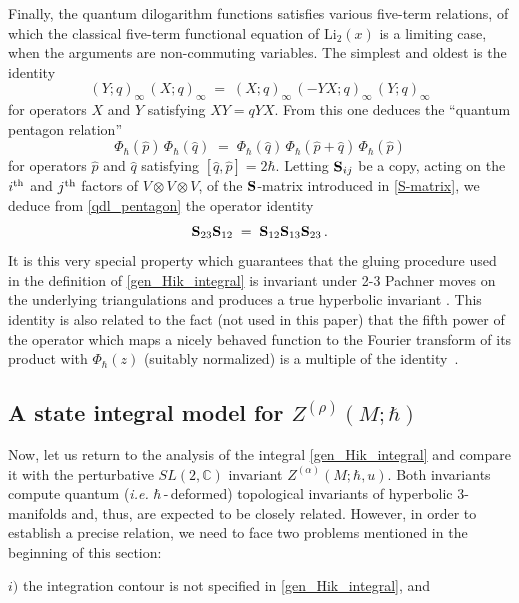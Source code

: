 \documentclass[hyper]{JHEP3}
\newcommand{\C}{{\mathbb{C}}}
\newcommand\be{\begin{equation}}
\newcommand\ee{\end{equation}}
\def\={\;=\;}
\def\Li{\text{Li}_2}
\begin{document}
\smallskip{}  Finally, the quantum dilogarithm functions
satisfies various five-term relations, of which the classical five-term functional
equation of $\Li(x)$ is a limiting case, when the arguments are non-commuting variables.
The simplest and oldest is the identity
\be (Y;q)_\infty\,(X;q)_\infty\=(X;q)_\infty\,(-YX;q)_\infty\,(Y;q)_\infty \label{pre-pentagon}\ee
for operators $X$ and $Y$ satisfying $XY=qYX$. From this one deduces the ``quantum pentagon relation''
  \be \label{qdl_pentagon} \Phi_\hbar(\hat{p})\,\Phi_\hbar(\hat q)
  \= \Phi_\hbar(\hat q)\,\Phi_\hbar(\hat p+\hat q)\,\Phi_\hbar(\hat p) \ee
for operators $\hat{p}$ and $\hat{q}$ satisfying $[\hat{q},\hat{p}]=2\hbar$.
Letting ${\bf S}_{ij}$ be a copy, acting on the $i^{{\rm th}}$ and $j^{{\rm th}}$
factors of $V\otimes V\otimes V$, of the ${\bf S}$-matrix introduced in \eqref{S-matrix},
we deduce from \eqref{qdl_pentagon} the operator identity
  \be\label{S_pentagon}
  {\bf S}_{23} {\bf S}_{12} \= {\bf S}_{12} {\bf S}_{13} {\bf S}_{23}\,.\ee
It is this very special property which guarantees that the gluing procedure
used in the definition of \eqref{gen_Hik_integral}
is invariant under 2-3 Pachner moves on the underlying triangulations and produces a true hyperbolic invariant
\cite{hikami-2001-16,hikami-2006,kashaev-2000}.
This identity is also related to
the fact (not used in this paper) that the fifth power of the operator which
maps a nicely behaved function to the Fourier transform of its product
with $\Phi_\hbar(z)$ (suitably normalized) is a multiple of the identity~\cite{goncharov-2007}.




\subsection{A state integral model for $Z^{(\rho)} (M;\hbar)$}
\label{sec:statesumdef}

Now, let us return to the analysis of the integral \eqref{gen_Hik_integral}
and compare it with the perturbative $SL(2,\C)$ invariant $Z^{(\alpha)} (M;\hbar,u)$.
Both invariants compute quantum ({\it i.e.} $\hbar$\,-\,deformed)
topological invariants of hyperbolic 3-manifolds and, thus,
are expected to be closely related.
However, in order to establish a precise relation,
we need to face two problems mentioned in the beginning of this section:

$i)$ the integration contour is not specified in \eqref{gen_Hik_integral}, and
\end{document}
